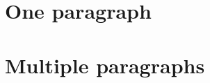 \documentclass[10pt]{article}
\begin{document}
\section{One paragraph}
\lipsum[1]

\section{Multiple paragraphs}
\lipsum[1-4]
\end{document}

